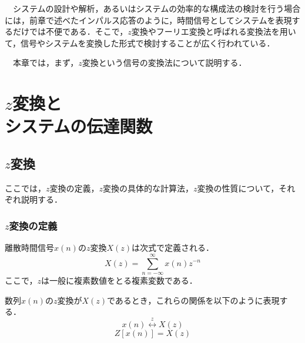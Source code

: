 
\begin{lead}

　システムの設計や解析，あるいはシステムの効率的な構成法の検討を行う場合には，前章で述べたインパルス応答のように，時間信号としてシステムを表現するだけでは不便である．そこで，$z$変換やフーリエ変換と呼ばれる変換法を用いて，信号やシステムを変換した形式で検討することが広く行われている．

　本章では，まず，$z$変換という信号の変換法について説明する．

\end{lead}





\chapter[$z$変換とシステムの伝達関数]{$z$変換と\\システムの伝達関数}

\label{chapter:40}

\section{$z$変換}

ここでは，$z$変換の定義，$z$変換の具体的な計算法，$z$変換の性質について，それぞれ説明する．

\subsection{$z$変換の定義}

離散時間信号$x(n)$の$z$変換$X(z)$は次式で定義される．
\begin{equation}
X(z)=\sum_{n=-\infty}^{\infty}x(n)z^{-n}
\label{eqn:eqn-3-01}
\end{equation}
%
ここで，$z$は一般に複素数値をとる複素変数である．

数列$x(n)$の$z$変換が$X(z)$であるとき，これらの関係を以下のように表現する．
\begin{equation}
x(n) \overset{z}{\leftrightarrow} X(z)
\end{equation}
\begin{equation}
Z[x(n)]=X(z)
\end{equation}

